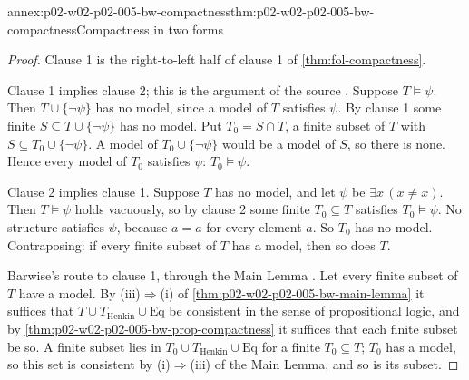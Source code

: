 \begin{annexitem}{annex:p02-w02-p02-005-bw-compactness}{thm:p02-w02-p02-005-bw-compactness}{Compactness in two forms}
\begin{proof}
Clause 1 is the right-to-left half of clause 1 of
\cref{thm:fol-compactness}.

Clause 1 implies clause 2; this is the argument of the source
\cite[ch.~A.1, \S2, p.~10]{Barwise1977FirstOrder}.  Suppose
\(T\models\psi\).  Then \(T\cup\{\neg\psi\}\) has no model, since a model
of \(T\) satisfies \(\psi\).  By clause 1 some finite
\(S\subseteq T\cup\{\neg\psi\}\) has no model.  Put \(T_0=S\cap T\), a
finite subset of \(T\) with \(S\subseteq T_0\cup\{\neg\psi\}\).  A model
of \(T_0\cup\{\neg\psi\}\) would be a model of \(S\), so there is none.
Hence every model of \(T_0\) satisfies \(\psi\): \(T_0\models\psi\).

Clause 2 implies clause 1.  Suppose \(T\) has no model, and let \(\psi\)
be \(\exists x\,(x\neq x)\).  Then \(T\models\psi\) holds vacuously, so by
clause 2 some finite \(T_0\subseteq T\) satisfies \(T_0\models\psi\).
No structure satisfies \(\psi\), because \(a=a\) for every element \(a\).
So \(T_0\) has no model.  Contraposing: if every finite subset of \(T\) has
a model, then so does \(T\).

Barwise's route to clause 1, through the Main Lemma
\cite[ch.~A.1, \S4, p.~33]{Barwise1977FirstOrder}.  Let every finite subset
of \(T\) have a model.  By (iii)\(\Rightarrow\)(i) of
\cref{thm:p02-w02-p02-005-bw-main-lemma} it suffices that
\(T\cup T_{\mathrm{Henkin}}\cup\mathrm{Eq}\) be consistent in the sense
of propositional logic, and by \cref{thm:p02-w02-p02-005-bw-prop-compactness}
it suffices that each finite subset be so.  A finite subset lies in
\(T_0\cup T_{\mathrm{Henkin}}\cup\mathrm{Eq}\) for a finite
\(T_0\subseteq T\); \(T_0\) has a model, so this set is consistent by
(i)\(\Rightarrow\)(iii) of the Main Lemma, and so is its subset.
\end{proof}
\end{annexitem}

